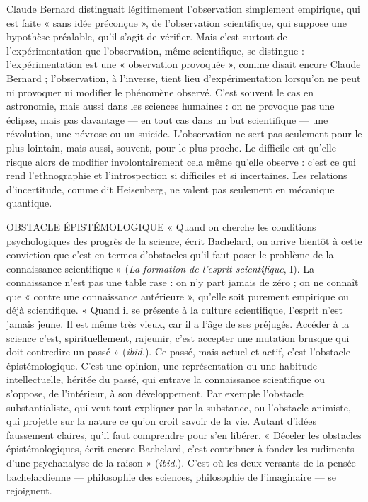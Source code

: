 Claude Bernard distinguait légitimement l’observation simplement empirique,
qui est faite « sans idée préconçue », de l'observation scientifique, qui
suppose une hypothèse préalable, qu’il s’agit de vérifier. Mais c’est surtout de
l’expérimentation que l'observation, même scientifique, se distingue : l’expérimentation
est une « observation provoquée », comme disait encore Claude
Bernard ; l'observation, à l'inverse, tient lieu d’expérimentation lorsqu'on ne
peut ni provoquer ni modifier le phénomène observé. C’est souvent le cas en
astronomie, mais aussi dans les sciences humaines : on ne provoque pas une
éclipse, mais pas davantage — en tout cas dans un but scientifique — une révolution,
une névrose ou un suicide. L'observation ne sert pas seulement pour le
plus lointain, mais aussi, souvent, pour le plus proche. Le difficile est qu’elle
risque alors de modifier involontairement cela même qu’elle observe : c’est ce
qui rend l’ethnographie et l’introspection si difficiles et si incertaines. Les relations
d’incertitude, comme dit Heisenberg, ne valent pas seulement en mécanique quantique.

OBSTACLE ÉPISTÉMOLOGIQUE  « Quand on cherche les conditions psychologiques
des progrès de la science,
écrit Bachelard, on arrive bientôt à cette conviction que c’est en termes d’obstacles
qu’il faut poser le problème de la connaissance scientifique » ({\it La formation
de l'esprit scientifique}, I). La connaissance n’est pas une table rase : on n’y
part jamais de zéro ; on ne connaît que « contre une connaissance antérieure »,
qu'elle soit purement empirique ou déjà scientifique. « Quand il se présente à
la culture scientifique, l'esprit n’est jamais jeune. Il est même très vieux, car il a
l’âge de ses préjugés. Accéder à la science c’est, spirituellement, rajeunir, c’est
accepter une mutation brusque qui doit contredire un passé » ({\it ibid.}). Ce passé,
mais actuel et actif, c’est l’obstacle épistémologique. C’est une opinion, une
représentation ou une habitude intellectuelle, héritée du passé, qui entrave la
connaissance scientifique ou s'oppose, de l’intérieur, à son développement. Par
exemple l’obstacle substantialiste, qui veut tout expliquer par la substance, ou
l'obstacle animiste, qui projette sur la nature ce qu’on croit savoir de la vie.
Autant d’idées faussement claires, qu’il faut comprendre pour s’en libérer.
« Déceler les obstacles épistémologiques, écrit encore Bachelard, c’est contribuer
à fonder les rudiments d’une psychanalyse de la raison » ({\it ibid.}). C’est où
les deux versants de la pensée bachelardienne — philosophie des sciences, philosophie
de l’imaginaire — se rejoignent.

